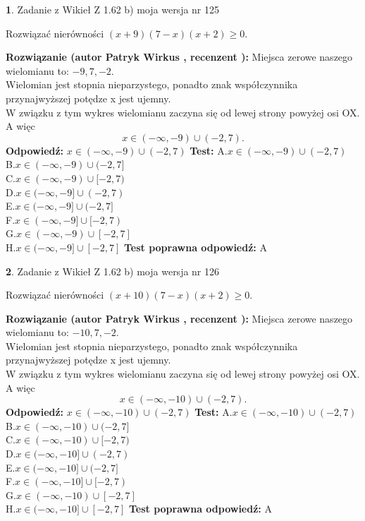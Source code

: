 \documentclass[12pt, a4paper]{article}
\theoremstyle{definition} %
\newtheorem{zad}{}
\newcommand{\zadStart}[1]{\begin{zad}#1\newline}
\newcommand{\zadStop}{\end{zad}}
\newcommand{\rozwStart}[2]{\noindent \textbf{Rozwiązanie (autor #1 , recenzent #2): }\newline}
\newcommand{\rozwStop}{\newline}
\newcommand{\odpStart}{\noindent \textbf{Odpowiedź:}\newline}
\newcommand{\odpStop}{\newline}
\newcommand{\testStart}{\noindent \textbf{Test:}\newline}
\newcommand{\testStop}{\newline}
\newcommand{\kluczStart}{\noindent \textbf{Test poprawna odpowiedź:}\newline}
\newcommand{\kluczStop}{\newline}
\begin{document}
\zadStart{Zadanie z Wikieł Z 1.62 b) moja wersja nr 125}

Rozwiązać nierówności $(x+9)(7-x)(x+2)\ge0$.
\zadStop
\rozwStart{Patryk Wirkus}{}
Miejsca zerowe naszego wielomianu to: $-9, 7, -2$.\\
Wielomian jest stopnia nieparzystego, ponadto znak współczynnika przy\linebreak najwyższej potędze x jest ujemny.\\ W związku z tym wykres wielomianu zaczyna się od lewej strony powyżej osi OX. A więc $$x \in (-\infty,-9) \cup (-2,7).$$
\rozwStop
\odpStart
$x \in (-\infty,-9) \cup (-2,7)$
\odpStop
\testStart
A.$x \in (-\infty,-9) \cup (-2,7)$\\
B.$x \in (-\infty,-9) \cup (-2,7]$\\
C.$x \in (-\infty,-9) \cup [-2,7)$\\
D.$x \in (-\infty,-9] \cup (-2,7)$\\
E.$x \in (-\infty,-9] \cup (-2,7]$\\
F.$x \in (-\infty,-9] \cup [-2,7)$\\
G.$x \in (-\infty,-9) \cup [-2,7]$\\
H.$x \in (-\infty,-9] \cup [-2,7]$
\testStop
\kluczStart
A
\kluczStop



\zadStart{Zadanie z Wikieł Z 1.62 b) moja wersja nr 126}

Rozwiązać nierówności $(x+10)(7-x)(x+2)\ge0$.
\zadStop
\rozwStart{Patryk Wirkus}{}
Miejsca zerowe naszego wielomianu to: $-10, 7, -2$.\\
Wielomian jest stopnia nieparzystego, ponadto znak współczynnika przy\linebreak najwyższej potędze x jest ujemny.\\ W związku z tym wykres wielomianu zaczyna się od lewej strony powyżej osi OX. A więc $$x \in (-\infty,-10) \cup (-2,7).$$
\rozwStop
\odpStart
$x \in (-\infty,-10) \cup (-2,7)$
\odpStop
\testStart
A.$x \in (-\infty,-10) \cup (-2,7)$\\
B.$x \in (-\infty,-10) \cup (-2,7]$\\
C.$x \in (-\infty,-10) \cup [-2,7)$\\
D.$x \in (-\infty,-10] \cup (-2,7)$\\
E.$x \in (-\infty,-10] \cup (-2,7]$\\
F.$x \in (-\infty,-10] \cup [-2,7)$\\
G.$x \in (-\infty,-10) \cup [-2,7]$\\
H.$x \in (-\infty,-10] \cup [-2,7]$
\testStop
\kluczStart
A
\kluczStop
\end{document}
